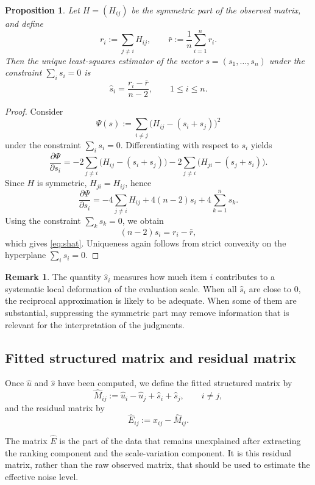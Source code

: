 \documentclass[11pt]{amsart}
\theoremstyle{definition}
\newtheorem{remark}[definition]{Remark}
\theoremstyle{plain}
\newtheorem{proposition}[definition]{Proposition}
\numberwithin{equation}{section}
\begin{document}
\begin{proposition}
Let $H=(H_{ij})$ be the symmetric part of the observed matrix, and define
\[
r_i:=\sum_{j\neq i}H_{ij},
\qquad
\bar r:=\frac1n\sum_{i=1}^n r_i.
\]
Then the unique least-squares estimator of the vector $s=(s_1,\dots,s_n)$ under the constraint $\sum_i s_i=0$ is
\begin{equation}\label{eq:shat}
\widehat s_i=\frac{r_i-\bar r}{n-2},
\qquad 1\le i\le n.
\end{equation}
\end{proposition}

\begin{proof}
Consider
\[
\Psi(s):=\sum_{i\neq j}\bigl(H_{ij}-(s_i+s_j)\bigr)^2
\]
under the constraint $\sum_i s_i=0$. Differentiating with respect to $s_i$ yields
\[
\frac{\partial \Psi}{\partial s_i}
=
-2\sum_{j\neq i}\bigl(H_{ij}-(s_i+s_j)\bigr)
-2\sum_{j\neq i}\bigl(H_{ji}-(s_j+s_i)\bigr).
\]
Since $H$ is symmetric, $H_{ji}=H_{ij}$, hence
\[
\frac{\partial \Psi}{\partial s_i}
=
-4\sum_{j\neq i}H_{ij}
+4(n-2)s_i+4\sum_{k=1}^n s_k.
\]
Using the constraint $\sum_k s_k=0$, we obtain
\[
(n-2)s_i=r_i-\bar r,
\]
which gives \eqref{eq:shat}. Uniqueness again follows from strict convexity on the hyperplane $\sum_i s_i=0$.
\end{proof}

\begin{remark}
The quantity $\widehat s_i$ measures how much item $i$ contributes to a systematic local deformation of the evaluation scale. When all $\widehat s_i$ are close to $0$, the reciprocal approximation is likely to be adequate. When some of them are substantial, suppressing the symmetric part may remove information that is relevant for the interpretation of the judgments.
\end{remark}

\subsection{Fitted structured matrix and residual matrix}

Once $\widehat u$ and $\widehat s$ have been computed, we define the fitted structured matrix by
\[
\widehat M_{ij}:=\widehat u_i-\widehat u_j+\widehat s_i+\widehat s_j,
\qquad i\neq j,
\]
and the residual matrix by
\begin{equation}\label{eq:residual}
\widehat E_{ij}:=x_{ij}-\widehat M_{ij}.
\end{equation}

The matrix $\widehat E$ is the part of the data that remains unexplained after extracting the ranking component and the scale-variation component. It is this residual matrix, rather than the raw observed matrix, that should be used to estimate the effective noise level.
\end{document}

